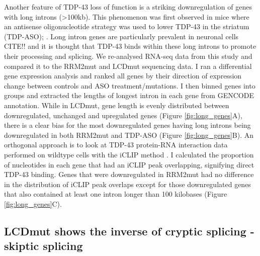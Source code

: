 Another feature of TDP-43 loss of function is a striking downregulation of genes with long introns (>100kb). This phenomenon was first observed in mice where an antisense oligonucleotide strategy was used to lower TDP-43 in the striatum (TDP-ASO); \citep{Polymenidou2011-hs}. Long intron genes are particularly prevalent in neuronal cells CITE!! and it is thought that TDP-43 binds within these long introns to promote their processing and splicing. We re-analysed RNA-seq data from this study and compared it to the RRM2mut and LCDmut sequencing data. I ran a differential gene expression analysis and ranked all genes by their direction of expression change between controls and ASO treatment/mutations. I then binned genes into groups and extracted the lengths of longest intron in each gene from GENCODE annotation. While in LCDmut, gene length is evenly distributed between downregulated, unchanged and upregulated genes (Figure \ref{fig:long_genes}A), there is a clear bias for the most downregulated genes having long introns being downregulated in both RRM2mut and TDP-ASO (Figure \ref{fig:long_genes}B). An orthogonal approach is to look at TDP-43 protein-RNA interaction data performed on wildtype cells with the iCLIP method \citep{Huppertz2014-ip}. I calculated the proportion of nucleotides in each gene that had an iCLIP peak overlapping, signifying direct TDP-43 binding. Genes that were downregulated in RRM2mut had no difference in the distribution of iCLIP peak overlaps except for those downregulated genes that also contained at least one intron longer than 100 kilobases (Figure \ref{fig:long_genes}C). 


\subsection{LCDmut shows the inverse of cryptic splicing - skiptic splicing}

